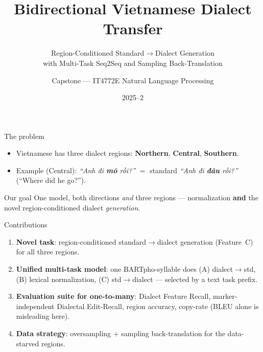 \documentclass[aspectratio=169,11pt]{beamer}
\title[VN Dialect Transfer]{Bidirectional Vietnamese Dialect Transfer}
\subtitle{Region-Conditioned Standard$\rightarrow$Dialect Generation\\with Multi-Task Seq2Seq and Sampling Back-Translation}
\author[Capstone]{Capstone --- IT4772E Natural Language Processing}
\institute[HUST]{Hanoi University of Science and Technology}
\date{2025--2}
\newcommand{\hl}[1]{\textcolor{oiblue}{\textbf{#1}}}
\begin{document}
\frame{\titlepage}

\begin{frame}{The problem}
  \begin{itemize}
    \item Vietnamese has three dialect regions: \hl{Northern}, \hl{Central}, \hl{Southern}.
    \item Example (Central): \emph{``Anh đi \hl{mô} rồi?''} $=$ standard \emph{``Anh đi \hl{đâu} rồi?''} (``Where did he go?'').
  \end{itemize}
  \vspace{0.4em}
  \centering
  \vspace{0.3em}
  \begin{block}{Our goal}
    One model, both directions \emph{and} three regions --- normalization \textbf{and} the novel
    region-conditioned dialect \emph{generation}.
  \end{block}
\end{frame}

\begin{frame}{Contributions}
  \begin{enumerate}
    \item \hl{Novel task}: region-conditioned standard$\rightarrow$dialect generation (Feature~C) for all three regions.
    \item \hl{Unified multi-task model}: one BARTpho-syllable does (A) dialect$\rightarrow$std,
          (B) lexical normalization, (C) std$\rightarrow$dialect --- selected by a text task prefix.
    \item \hl{Evaluation suite for one-to-many}: Dialect Feature Recall, marker-independent
          Dialectal Edit-Recall, region accuracy, copy-rate (BLEU alone is misleading here).
    \item \hl{Data strategy}: oversampling $+$ sampling back-translation for the data-starved regions.
  \end{enumerate}
\end{frame}
\end{document}
